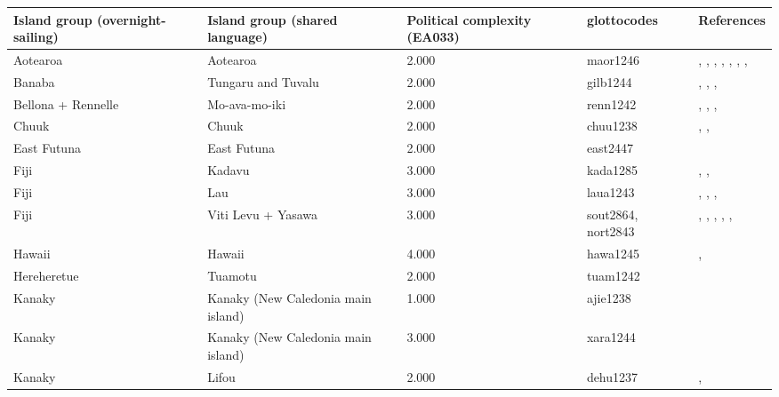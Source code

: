 \begin{longtable}{p{1.8cm}p{1.8cm}p{1.8cm}p{2cm}p{7cm}}
  \toprule
Island group (overnight-sailing) & Island group (shared language) & Political complexity (EA033) & glottocodes & References \\ 
  \midrule
Aotearoa & Aotearoa & 2.000 & maor1246 & \citet{sahlins1958social}, \citet{sahlins1958social}, \citet{Buck PH (1952) The Coming of the Maori (Whitcombe and Tombs: Wellington, New Zealand).}, \citet{Buck PH (1952) The Coming of the Maori (Whitcombe and Tombs: Wellington, New Zealand).}, \citet{kirch1984evolution}, \citet{kirch1984evolution}, \citet{van1995maori}, \citet{van1995maori} \\ 
  Banaba & Tungaru and Tuvalu & 2.000 & gilb1244 & \citet{lambert1966}, \citet{lambert1975makin}, \citet{lambert1991}, \citet{macdonald1982cinderellas} \\ 
  Bellona + Rennelle & Mo-ava-mo-iki & 2.000 & renn1242 & \citet{birketsmith1956}, \citet{birketsmith1956}, \citet{monberg1991bellona}, \citet{monberg1991bellona} \\ 
  Chuuk & Chuuk & 2.000 & chuu1238 & \citet{goodenough1991}, \citet{goodenough2002under}, \citet{mahony1960taro} \\ 
  East Futuna & East Futuna & 2.000 & east2447 & \citet{kirch1994wet} \\ 
  Fiji & Kadavu & 3.000 & kada1285 & \citet{kuhlken2002intensive}, \citet{scarr1984fiji}, \citet{walter1978examination} \\ 
  Fiji & Lau & 3.000 & laua1243 & \citet{hocart_1929}, \citet{quain_1948}, \citet{thompson1940a}, \citet{thompson1940b} \\ 
  Fiji & Viti Levu + Yasawa & 3.000 & sout2864, nort2843 & \citet{kuhlken2002intensive}, \citet{kuhlken2002intensive}, \citet{scarr1984fiji}, \citet{scarr1984fiji}, \citet{walter1978examination}, \citet{walter1978examination} \\ 
  Hawaii & Hawaii & 4.000 & hawa1245 & \citet{kirch1994wet}, \citet{kirch2010chiefs} \\ 
  Hereheretue & Tuamotu & 2.000 & tuam1242 & \citet{emory1975material} \\ 
  Kanaky & Kanaky (New Caledonia main island) & 1.000 & ajie1238 & \citet{winslow1991} \\ 
  Kanaky & Kanaky (New Caledonia main island) & 3.000 & xara1244 & \citet{young1991goodenough} \\ 
  Kanaky & Lifou & 2.000 & dehu1237 & \citet{hadfield_1920}, \citet{ray1917people} \\ 

\end{longtable}
